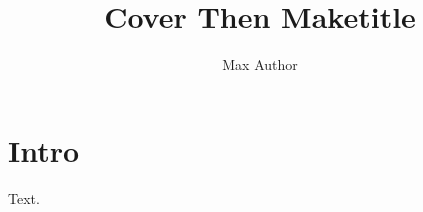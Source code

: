 \documentclass{article}
\title{Cover Then Maketitle}
\author{Max Author}
\begin{document}
\begin{center}{\Huge \@title\par}\end{center}
\maketitle
\section{Intro}
Text.
\end{document}
